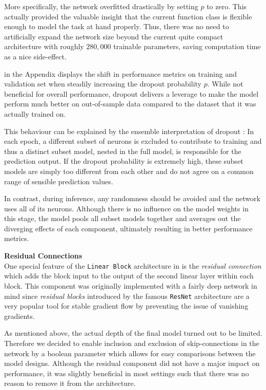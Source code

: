 More specifically, the network overfitted drastically by setting $p$ to zero.
This actually provided the valuable insight that the current function class is flexible enough to model the task at hand properly.
Thus, there was no need to artificially expand the network size beyond the current quite compact architecture with roughly $280,000$ trainable parameters, saving computation time as a nice side-effect.

 in the Appendix displays the shift in performance metrics on training and validation set when steadily increasing the dropout probability $p$.
While not beneficial for overall performance, dropout delivers a leverage to make the model perform much better on out-of-sample data compared to the dataset that it was actually trained on.

This behaviour can be explained by the ensemble interpretation of dropout \citep{goodfellow2016}:
In each epoch, a different subset of neurons is excluded to contribute to training and thus a distinct subset model, nested in the full model, is responsible for the prediction output.
If the dropout probability is extremely high, these subset models are simply too different from each other and do not agree on a common range of sensible prediction values.

In contrast, during inference, any randomness should be avoided and the network uses all of its neurons.
Although there is no influence on the model weights in this stage, the model pools all subset models together and averages out the diverging effects of each component, ultimately resulting in better performance metrics.

\textbf{Residual Connections} \\
One special feature of the \texttt{Linear Block} architecture in  is the \emph{residual connection} which adds the block input to the output of the second linear layer within each block.
This component was originally implemented with a fairly deep network in mind since \emph{residual blocks} introduced by the famous \texttt{ResNet} architecture \citep{he2015} are a very popular tool for stable gradient flow by preventing the issue of vanishing gradients.

As mentioned above, the actual depth of the final model turned out to be limited.
Therefore we decided to enable inclusion and exclusion of skip-connections in the network by a boolean parameter which allows for easy comparisons between the model designs.
Although the residual component did not have a major impact on performance, it was slightly beneficial in most settings such that there was no reason to remove it from the architecture.

